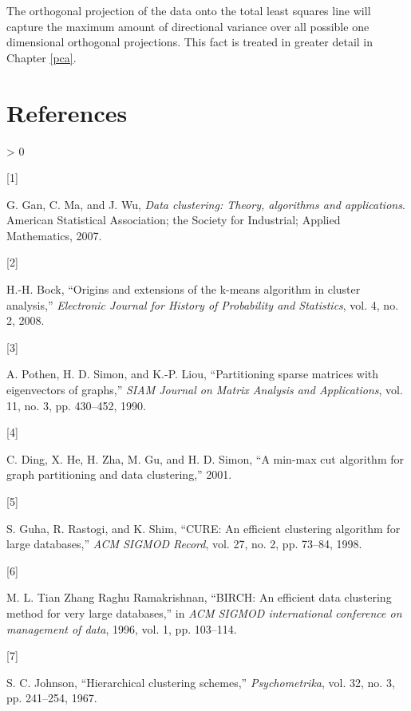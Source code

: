 \documentclass[
]{article}
\newlength{\cslhangindent}
\newlength{\csllabelwidth}
\newenvironment{CSLReferences}[3] %
 {%
  \setlength{\parindent}{0pt}
  \ifodd #1 \everypar{\setlength{\hangindent}{\cslhangindent}}\ignorespaces\fi
  \ifnum #2 > 0
  \setlength{\parskip}{#3\baselineskip}
  \fi
 }%
 {}
\newcommand{\CSLLeftMargin}[1]{\parbox[t]{\maxof{\widthof{#1}}{\csllabelwidth}}{#1}}
\newcommand{\CSLRightInline}[1]{\parbox[t]{\linewidth}{#1}}
\theoremstyle{definition}
\theoremstyle{definition}
\theoremstyle{definition}
\theoremstyle{definition}
\theoremstyle{remark}
\begin{document}
The orthogonal projection of the data onto the total least squares line will capture the maximum amount of directional variance over all possible one dimensional orthogonal projections. This fact is treated in greater detail in Chapter \ref{pca}.

\hypertarget{references}{%
\section{References}\label{references}}

\hypertarget{refs}{}
\begin{CSLReferences}{0}{0}
\leavevmode\hypertarget{ref-dcebook}{}%
\CSLLeftMargin{{[}1{]} }
\CSLRightInline{G. Gan, C. Ma, and J. Wu, \emph{Data clustering: Theory, algorithms and applications}. American Statistical Association; the Society for Industrial; Applied Mathematics, 2007.}

\leavevmode\hypertarget{ref-bock}{}%
\CSLLeftMargin{{[}2{]} }
\CSLRightInline{H.-H. Bock, {``Origins and extensions of the k-means algorithm in cluster analysis,''} \emph{Electronic Journal for History of Probability and Statistics}, vol. 4, no. 2, 2008.}

\leavevmode\hypertarget{ref-pothen}{}%
\CSLLeftMargin{{[}3{]} }
\CSLRightInline{A. Pothen, H. D. Simon, and K.-P. Liou, {``Partitioning sparse matrices with eigenvectors of graphs,''} \emph{SIAM Journal on Matrix Analysis and Applications}, vol. 11, no. 3, pp. 430--452, 1990.}

\leavevmode\hypertarget{ref-minmax}{}%
\CSLLeftMargin{{[}4{]} }
\CSLRightInline{C. Ding, X. He, H. Zha, M. Gu, and H. D. Simon, {``A min-max cut algorithm for graph partitioning and data clustering,''} 2001.}

\leavevmode\hypertarget{ref-cure}{}%
\CSLLeftMargin{{[}5{]} }
\CSLRightInline{S. Guha, R. Rastogi, and K. Shim, {``CURE: An efficient clustering algorithm for large databases,''} \emph{ACM SIGMOD Record}, vol. 27, no. 2, pp. 73--84, 1998.}

\leavevmode\hypertarget{ref-birch}{}%
\CSLLeftMargin{{[}6{]} }
\CSLRightInline{M. L. Tian Zhang Raghu Ramakrishnan, {``BIRCH: An efficient data clustering method for very large databases,''} in \emph{ACM SIGMOD international conference on management of data}, 1996, vol. 1, pp. 103--114.}

\leavevmode\hypertarget{ref-johnson67}{}%
\CSLLeftMargin{{[}7{]} }
\CSLRightInline{S. C. Johnson, {``Hierarchical clustering schemes,''} \emph{Psychometrika}, vol. 32, no. 3, pp. 241--254, 1967.}


\end{CSLReferences}
\end{document}
